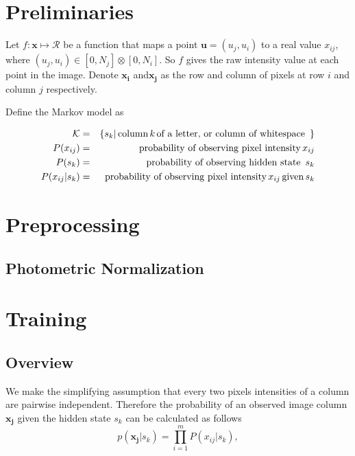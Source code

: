 \documentclass[a4paper,12pt]{article}
\newcounter{ohNoteCounter}
\newcommand{\ohnote}[1]{{\scriptsize  \color{Cgreen} $\clubsuit$~\refstepcounter{ohNoteCounter}\textsf{[OH]$_{\arabic{ohNoteCounter}}$:{#1}}}}
\newcounter{jpNoteCounter}
\newcommand{\jpnote}[1]{{\scriptsize  \color{Cblue} $\blacksquare$ \refstepcounter{jpNoteCounter}\textsf{[JP]$_{\arabic{jpNoteCounter}}$:{#1}}}}
\renewcommand{\jpnote}[1]{}
\renewcommand{\ohnote}[1]{}
\begin{document}
  \pagestyle{empty}
  \ohnote{This is useful way to leave notes. Both of us have command tu leave notes. I have \textbackslash ohnote, you have \textbackslash jpnote. Notes in whole document can be disabled by creating file with name ``.notes\_disabled''. }

  \jpnote{Your notes will look like this }

  \section{Preliminaries}
  Let $f : \mathbf{x} \mapsto \mathcal{R}$ be a function that maps a point $\mathbf{u} = (u_j,u_i)$ to a real value $x_{ij}$, where $(u_j,u_i) \in [0,N_j] \otimes [0,N_i]$.  So $f$ gives the raw intensity value at each point in the image.  Denote $\mathbf{x_i}$ and$\mathbf{x_j}$  as the row and column of pixels at row $i$ and column $j$ respectively.  

  Define the Markov model as 

  \begin{eqnarray*}
    \mathcal{K} &=& \{ s_k | \text{\,column\,} k \text{\,of a letter, or column of whitespace \,} \} \\
    P(x_{ij}) &=& \text{probability of observing pixel intensity\,} x_{ij} \\
    P(s_k) &=& \text{probability of observing hidden state \,} s_{k} \\
    P(x_{ij}|s_k) &=& \text{probability of observing pixel intensity\,} x_{ij} \text{\,given\,} s_k  
  \end{eqnarray*}

  \section{Preprocessing}
  \subsection{Photometric Normalization}

  \section{Training}
  \subsection{Overview}
  We make the simplifying assumption that every two pixels intensities
  of a column are pairwise independent. Therefore the probability of
  an observed image column $\mathbf{x_j}$ given the hidden state $s_k$
  can be calculated as follows
  \begin{equation}
    p(\mathbf{x_j}|s_k) = \prod_{i=1}^{m} P(x_{ij}|s_k) ,
  \end{equation}
  
\end{document}
